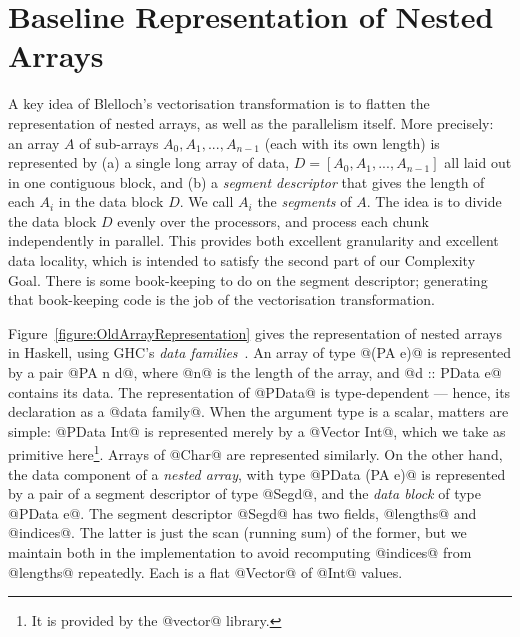 
\clearpage{}
\section{Baseline Representation of Nested Arrays} 
\label{section:naive-flat}
A key idea of Blelloch's vectorisation transformation is to flatten the representation of nested arrays, as well as the parallelism itself. More precisely: an array $A$ of sub-arrays $A_0, A_1, ..., A_{n-1}$ (each with its own length) is represented by (a) a single long array of data, $D = [A_0, A_1, ..., A_{n-1}]$ all laid out in one contiguous block, and (b) a \emph{segment descriptor} that gives the length of each $A_i$ in the data block $D$.  We call $A_i$ the \emph{segments} of $A$.  The idea is to divide the data block $D$ evenly over the processors, and process each chunk independently in parallel. This provides both excellent granularity and excellent data locality, which is intended to satisfy the second part of our Complexity Goal. There is some book-keeping to do on the segment descriptor; generating that book-keeping code is the job of the vectorisation transformation.

Figure~\ref{figure:OldArrayRepresentation} gives the representation of nested arrays in Haskell, using GHC's \emph{data families}~\cite{chak-etal:ATs}.  An array of type @(PA e)@ is represented by a pair @PA n d@, where @n@ is the length of the array, and @d :: PData e@ contains its data.  The representation of @PData@ is type-dependent --- hence, its declaration as a @data family@.  When the argument type is a scalar, matters are simple: @PData Int@ is represented merely by a @Vector Int@, which we take as primitive here\footnote{It is provided by the @vector@ library.}. Arrays of @Char@ are represented similarly. On the other hand, the data component of a \emph{nested array}, with type @PData (PA e)@ is represented by a pair of a segment descriptor of type @Segd@, and the \emph{data block} of type @PData e@.  
The segment descriptor @Segd@ has two fields, @lengths@ and @indices@.  The latter is just the scan (running sum) of the former, but we maintain both in the implementation to avoid recomputing @indices@ from @lengths@ repeatedly.  Each is a flat @Vector@ of @Int@ values.

